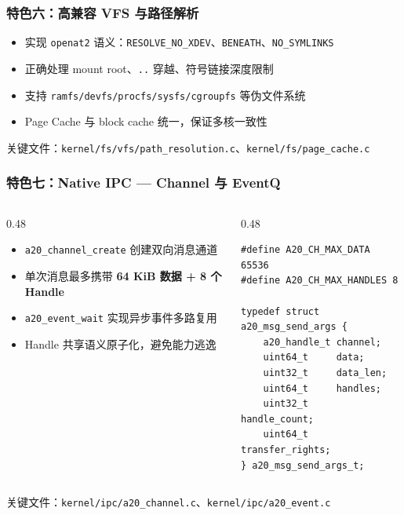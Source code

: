 \documentclass[aspectratio=1610]{beamer}
\newcommand{\code}[1]{\texttt{\footnotesize #1}}
\newcommand{\high}[1]{\textbf{\textcolor{ThemeColor}{#1}}}
\begin{document}
\begin{frame}
    \frametitle{特色六：高兼容 VFS 与路径解析}
    \begin{itemize}
        \item 实现 \code{openat2} 语义：\code{RESOLVE\_NO\_XDEV}、\code{BENEATH}、\code{NO\_SYMLINKS}
        \item 正确处理 mount root、\code{..} 穿越、符号链接深度限制
        \item 支持 \code{ramfs/devfs/procfs/sysfs/cgroupfs} 等伪文件系统
        \item Page Cache 与 block cache 统一，保证多核一致性
    \end{itemize}
    \vspace{0.3em}
    \small 关键文件：\code{kernel/fs/vfs/path\_resolution.c}、\code{kernel/fs/page\_cache.c}
\end{frame}

\begin{frame}[fragile]
    \frametitle{特色七：Native IPC — Channel 与 EventQ}
    \begin{columns}
        \begin{column}{0.48\textwidth}
            \begin{itemize}
                \item \code{a20\_channel\_create} 创建双向消息通道
                \item 单次消息最多携带 \high{64 KiB 数据 + 8 个 Handle}
                \item \code{a20\_event\_wait} 实现异步事件多路复用
                \item Handle 共享语义原子化，避免能力逃逸
            \end{itemize}
        \end{column}
        \begin{column}{0.48\textwidth}
            \begin{lstlisting}[basicstyle=\ttfamily\tiny]
#define A20_CH_MAX_DATA    65536
#define A20_CH_MAX_HANDLES 8

typedef struct a20_msg_send_args {
    a20_handle_t channel;
    uint64_t     data;
    uint32_t     data_len;
    uint64_t     handles;
    uint32_t     handle_count;
    uint64_t     transfer_rights;
} a20_msg_send_args_t;
            \end{lstlisting}
        \end{column}
    \end{columns}
    \vspace{0.3em}
    \small 关键文件：\code{kernel/ipc/a20\_channel.c}、\code{kernel/ipc/a20\_event.c}
\end{frame}
\end{document}
